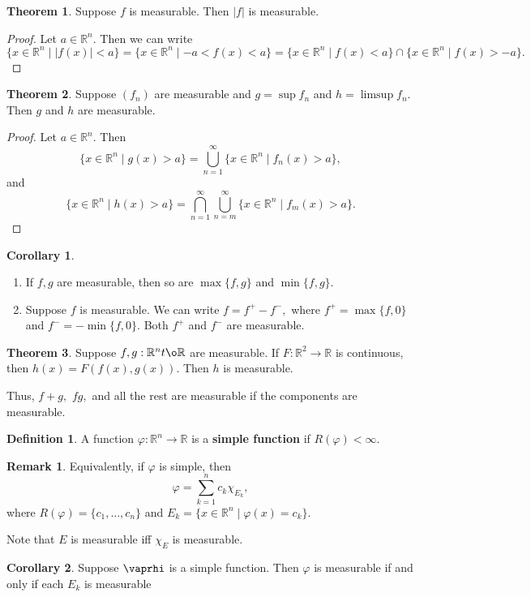 \documentclass[10pt, oneside]{article}
\newcommand{\bbR}{\mathbb{R}}
\theoremstyle{definition}
\newtheorem{thm}{Theorem}
\newtheorem{defn}{Definition}
\newtheorem{rem}{Remark}
\newtheorem{cor}{Corollary}
\begin{document}
\begin{thm}
    Suppose $f$ is measurable. Then $|f|$ is measurable.
\end{thm}
\begin{proof}
    Let $a\in \bbR^n.$ Then we can write
    \[\{x \in \bbR^n \mid |f(x)| < a\} = \{x \in \bbR^n \mid -a<f(x) < a\} = \{x \in \bbR^n \mid f(x) < a\} \cap \{x \in \bbR^n \mid f(x) >- a\}.\]
\end{proof}
\begin{thm}
    Suppose $(f_n)$ are measurable and $g = \sup f_n$ and $h = \limsup f_n.$ Then $g$ and $h$ are measurable.
\end{thm}
\begin{proof}
    Let $a\in \bbR^n.$ Then 
    \[\{x \in \bbR^n \mid g(x) > a\} = \bigcup_{n=1}^\infty \{x \in \bbR^n \mid f_n(x) >a\},\] and 
    \[\{x \in \bbR^n \mid h(x) > a\} = \bigcap_{n=1}^\infty\bigcup_{n=m}^\infty \{x \in \bbR^n \mid f_m(x) >a\}.\]
\end{proof}

\begin{cor}
\begin{enumerate}
    \item If $f,g$ are measurable, then so are $\max\{f,g\}$ and $\min\{f,g\}.$
    \item Suppose $f$ is measurable. We can write $f = f^+ - f^-,$ where $f^+ = \max\{f,0\}$ and $f^- = -\min\{f,0\}.$ Both $f^+$ and $f^-$ are measurable.
\end{enumerate}
\end{cor}

\begin{thm}
    Suppose $f,g: \bbR^n t\o \bbR$ are measurable. If $F: \bbR^2 \to \bbR$ is continuous, then $h(x) = F(f(x), g(x)).$ Then $h$ is measurable. 
\end{thm}
Thus, $f + g,$ $fg,$ and all the rest are measurable if the components are measurable.

\begin{defn}
    A function $\varphi: \bbR^n \to \bbR$ is a \textbf{simple function} if $R(\varphi) < \infty.$
\end{defn}
\begin{rem}
    Equivalently, if $\varphi$ is simple, then 
    \[\varphi = \sum_{k=1}^n c_k \chi_{E_k},\] where $R(\varphi)= \{c_1, \dots, c_n\}$ and $E_k  = \{x \in \bbR^n \mid \varphi(x)  = c_k\}.$
\end{rem}
Note that $E$ is measurable iff $\chi_E$ is measurable.
\begin{cor}
    Suppose $\vaprhi$ is a simple function. Then $\varphi$ is measurable if and only if each $E_k$ is measurable
\end{cor}
\end{document}

